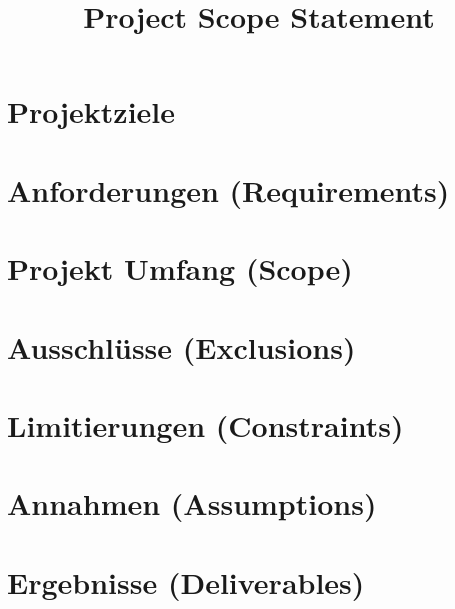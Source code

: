 \documentclass{article}
\title{Project Scope Statement}
\date{}
\begin{document}
\pagestyle{empty}

\maketitle

\section{Projektziele}

\section{Anforderungen (Requirements)}

\section{Projekt Umfang (Scope)}

\section{Ausschlüsse (Exclusions)}

\section{Limitierungen (Constraints)}

\section{Annahmen (Assumptions)}

\section{Ergebnisse (Deliverables)}
\end{document}
